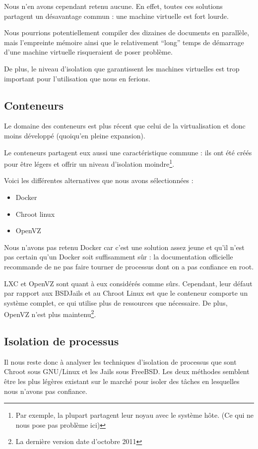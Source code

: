 \documentclass[10pt,a4paper]{article}
\begin{document}
Nous n'en avons cependant retenu aucune. En effet, toutes ces solutions partagent un désavantage commun : une machine virtuelle est fort lourde.

Nous pourrions potentiellement compiler des dizaines de documents en parallèle, mais l'empreinte mémoire ainsi que le relativement ``long'' temps de démarrage d'une machine virtuelle risqueraient de poser problème.

De plus, le niveau d'isolation que garantissent les machines virtuelles est trop important pour l'utilisation que nous en ferions.

\subsection{Conteneurs}
Le domaine des conteneurs est plus récent que celui de la virtualisation et donc moins développé (quoiqu'en pleine expansion).

Le conteneurs partagent eux aussi une caractéristique commune : ils ont été créés pour être légers et offrir un niveau d'isolation moindre\footnote{Par exemple, la plupart partagent leur noyau avec le système hôte. (Ce qui ne nous pose pas problème ici)}.

Voici les différentes alternatives que nous avons sélectionnées :

\begin{itemize}
    \item{Docker}
    \item{Chroot linux}
    \item{OpenVZ}
\end{itemize}

Nous n'avons pas retenu Docker car c'est une solution assez jeune et qu'il n'est pas certain qu'un Docker soit suffisamment sûr : la documentation officielle recommande de ne pas faire tourner de processus dont on a pas confiance en root.

LXC et OpenVZ sont quant à eux considérés comme sûrs.
Cependant, leur défaut par rapport aux BSDJails et au Chroot Linux est que le conteneur comporte un système complet, ce qui utilise plus de ressources que nécessaire.
De plus, OpenVZ n'est plus maintenu\footnote{La dernière version date d'octobre 2011}.

\subsection{Isolation de processus}

Il nous reste donc à analyser les techniques d'isolation de processus que sont Chroot sous GNU/Linux et les Jails sous FreeBSD.
Les deux méthodes semblent être les plus légères existant sur le marché pour isoler des tâches en lesquelles nous n'avons pas confiance.
\end{document}
